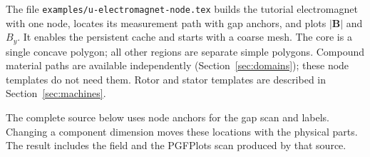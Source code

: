 The file \nolinkurl{examples/u-electromagnet-node.tex} builds the tutorial
electromagnet with one node, locates its measurement path with gap anchors,
and plots $|\mathbf B|$ and $B_y$. It enables the persistent cache and starts
with a coarse mesh. The core is a single concave polygon; all other regions
are separate simple polygons. Compound material paths are available
independently (Section~\ref{sec:domains}); these node templates do not need
them. Rotor and stator templates are described in Section~\ref{sec:machines}.

The complete source below uses node anchors for the gap scan and labels.
Changing a component dimension moves these locations with the physical parts.
The result includes the field and the PGFPlots scan produced by that source.
